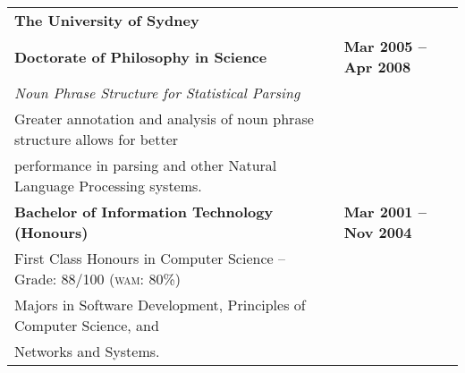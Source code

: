 \documentclass[]{article}
\begin{document}
\setlength{\tabcolsep}{0.1cm}
\begin{table*}[h!]
\begin{tabular}[h!]{p{12.7cm}l}

\textbf{The University of Sydney} & \\
\textbf{Doctorate of Philosophy in Science} & \textbf{Mar 2005 -- Apr 2008}\\
\hspace{0.5cm}\textit{Noun Phrase Structure for Statistical Parsing} & \\
\hspace{0.5cm}Greater annotation and analysis of noun phrase structure allows for better & \\
\hspace{0.5cm}performance in parsing and other Natural Language Processing systems. & \\

\textbf{Bachelor of Information Technology (Honours)} & \textbf{Mar 2001 -- Nov 2004}\\
\hspace{0.5cm}First Class Honours in Computer Science -- Grade: 88/100 (\textsc{wam}: 80\%) & \\
\hspace{0.5cm}Majors in Software Development, Principles of Computer Science, and & \\
\hspace{0.5cm}Networks and Systems. & \\


\end{tabular}
\end{table*}
\end{document}
